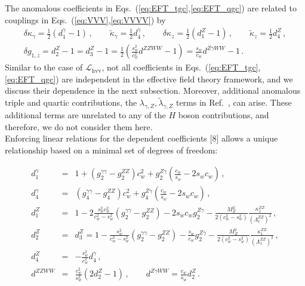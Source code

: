 \documentclass[aps,superscriptaddress,nofootinbib]{revtex4}
\begin{document}
The anomalous coefficients in Eqs.~(\ref{eq:EFT_tgc},\ref{eq:EFT_qgc}) are related to couplings in Eqs.~(\ref{eq:VVV},\ref{eq:VVVV}) by 
\begin{eqnarray}  
  \delta \kappa_\gamma = \frac12 \left( d_1^\gamma - 1 \right) \,,
  \quad\quad 
  \tilde \kappa_\gamma =  \frac12 d_4^\gamma \,,
  \quad\quad 
  \delta \kappa_z = \frac12 \left( d_1^Z - 1 \right) \,,
  \quad\quad 
  \tilde  \kappa_z =  \frac12 d_4^Z \,,
  \nonumber \\ 
  \delta g_{1,z} = d_2^Z - 1= d_3^Z - 1= \frac12 \left( \frac{s_w^2}{c_w^2} d^{ZZWW}-1 \right) = \frac{s_w}{c_w} d^{Z \gamma WW} -1
  \label{eq:dg1z}
  \,.
\end{eqnarray}
Similar to the case of $\mathcal{L}_\mathrm{hvv}$, not all coefficients in Eqs.~(\ref{eq:EFT_tgc},\ref{eq:EFT_qgc}) 
are independent in the effective field theory framework, and we discuss their dependence in the next subsection. 
Moreover, additional anomalous triple and quartic contributions, the $\lambda_{\gamma,Z}, \tilde \lambda_{\gamma,Z}$ 
terms in Ref.~\cite{Falkowski:2001958,deFlorian:2016spz}, can arise. 
These additional terms are unrelated to any of the $H$ boson contributions, and therefore, we do not consider them here. 
\\

Enforcing linear relations for the dependent coefficients [8] allows a unique relationship based on a minimal set of
degrees of freedom:

\begin{eqnarray}
  d_1^\gamma &=& 1 + (g_2^{\gamma\gamma}-g_2^{ZZ}) c_w^2  + g_2^{Z\gamma} \left(\frac{c_w}{s_w}-2s_w c_w \right)\,,
   \label{eq:d1}
  \\
  d_4^{\gamma} &=& (g_4^{\gamma\gamma}-g_4^{ZZ}) c_w^2 + g_4^{Z\gamma} \left( \frac{c_w}{s_w}-2 s_w c_w \right)\,,
   \label{eq:d2}
  \\
  d_1^Z &=& 1 -2 \frac{s_w^2 c_w^2}{c_w^2-s_w^2} \left(g_2^{\gamma\gamma}  -g_2^{ZZ} \right) -2 s_w c_w g_2^{Z\gamma} - \frac{M_Z^2}{2 (c_w^2-s_w^2) }  \frac{\kappa_1^{ZZ}}{(\Lambda_1^{ZZ})^2}\,,
   \label{eq:d3}
  \\
  d_2^Z &=& d_3^Z = 1 - \frac{s_w^2}{c_w^2-s_w^2} \left(g_2^{\gamma\gamma}-g_2^{ZZ} \right) - \frac{s_w}{c_w} g_2^{Z\gamma} - \frac{M_Z^2}{2(c_w^2-s_w^2)} \frac{\kappa_1^{ZZ}}{(\Lambda_1^{ZZ})^2}\,,
   \label{eq:d4}
  \\
  d_4^Z &=& -\frac{s_w^2}{c_w^2} d_4^{\gamma}\,,
   \label{eq:d5}
  \\
  d^{ZZWW} &=& \frac{c_w^2}{s_w^2} \left( 2 d_2^Z -1 \right)\,,
  \quad\quad
  d^{Z\gamma WW} = \frac{c_w}{s_w} d_2^Z\,.
   \label{eq:d6}
\end{eqnarray}
\end{document}
